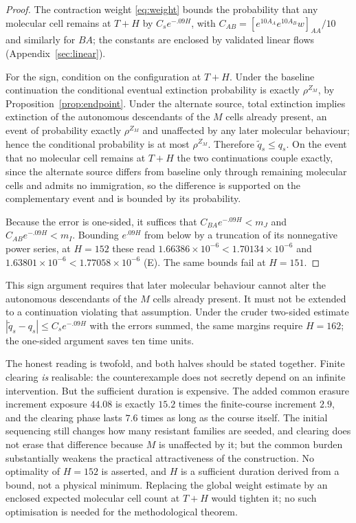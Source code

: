 \documentclass[11pt]{article}
\theoremstyle{remark}
\begin{document}
\begin{proof}
The contraction weight \eqref{eq:weight} bounds the probability that any
molecular cell remains at $T+H$ by $C_se^{-.09H}$, with
$C_{AB}=[e^{10A_A}e^{10A_B}w]_{AA}/10$ and similarly for $BA$; the constants are
enclosed by validated linear flows (Appendix~\ref{sec:linear}).

For the sign, condition on the configuration at $T+H$. Under the baseline
continuation the conditional eventual extinction probability is exactly
$\rho^{Z_M}$, by Proposition~\ref{prop:endpoint}. Under the alternate source,
total extinction implies extinction of the autonomous descendants of the $M$
cells already present, an event of probability exactly $\rho^{Z_M}$ and
unaffected by any later molecular behaviour; hence the conditional probability is
at most $\rho^{Z_M}$. Therefore $\widetilde q_s\le q_s$. On the event that no
molecular cell remains at $T+H$ the two continuations couple exactly, since the
alternate source differs from baseline only through remaining molecular cells and
admits no immigration, so the difference is supported on the complementary event
and is bounded by its probability.

Because the error is one-sided, it suffices that $C_{BA}e^{-.09H}<m_J$ and
$C_{AB}e^{-.09H}<m_I$. Bounding $e^{.09H}$ from below by a truncation of its
nonnegative power series, at $H=152$ these read
$1.66386\times10^{-6}<1.70134\times10^{-6}$ and
$1.63801\times10^{-6}<1.77058\times10^{-6}$ \textup{(E)}. The same bounds fail at
$H=151$.
\end{proof}

This sign argument requires that later molecular behaviour cannot alter the
autonomous descendants of the $M$ cells already present. It must not be extended
to a continuation violating that assumption. Under the cruder two-sided estimate
$|\widetilde q_s-q_s|\le C_se^{-.09H}$ with the errors summed, the same margins
require $H=162$; the one-sided argument saves ten time units.

The honest reading is twofold, and both halves should be stated together. Finite
clearing \emph{is} realisable: the counterexample does not secretly depend on an
infinite intervention. But the sufficient duration is expensive. The added common
erasure increment exposure $44.08$ is exactly $15.2$ times the finite-course
increment $2.9$, and the clearing phase lasts $7.6$ times as long as the course
itself. The initial sequencing still changes how many resistant families are
seeded, and clearing does not erase that difference because $M$ is unaffected by
it; but the common burden substantially weakens the practical attractiveness of
the construction. No optimality of $H=152$ is asserted, and $H$ is a sufficient
duration derived from a bound, not a physical minimum. Replacing the global
weight estimate by an enclosed expected molecular cell count at $T+H$ would
tighten it; no such optimisation is needed for the methodological theorem.
\end{document}
